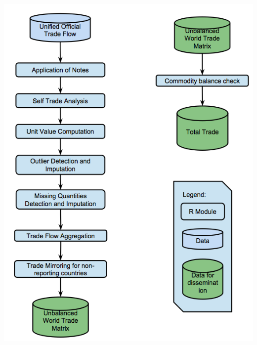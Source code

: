 \documentclass[nojss]{jss}\usepackage[]{graphicx}\usepackage[]{color}
\begin{document}
\begin{center}\includegraphics[scale = 0.01]{"trade_1_bis"}\end{center}
\end{document}
